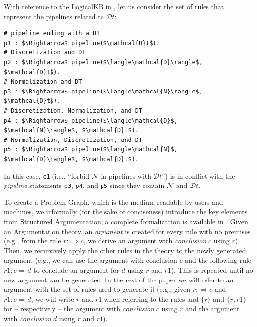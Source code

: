 \begin{example}
With reference to the LogicalKB in , let us consider the set of rules that represent the pipelines related to $\mathcal{D}t$:
\begin{lstlisting}[mathescape=true]
# pipeline ending with a DT
p1 : $\Rightarrow$ pipeline($\mathcal{D}t$).
# Discretization and DT
p2 : $\Rightarrow$ pipeline($\langle\mathcal{D}\rangle$, $\mathcal{D}t$).
# Normalization and DT
p3 : $\Rightarrow$ pipeline($\langle\mathcal{N}\rangle$, $\mathcal{D}t$).
# Discretization, Normalization, and DT
p4 : $\Rightarrow$ pipeline($\langle\mathcal{D}$, $\mathcal{N}\rangle$, $\mathcal{D}t$).
# Normalization, Discretization, and DT
p5 : $\Rightarrow$ pipeline($\langle\mathcal{N}$, $\mathcal{D}\rangle$, $\mathcal{D}t$).
\end{lstlisting}
In this case, \texttt{c1} (i.e., ``forbid $\mathcal{N}$ in pipelines with $\mathcal{D}t$'') is in conflict with the \emph{pipeline} statements \texttt{p3}, \texttt{p4}, and \texttt{p5} since they contain $\mathcal{N}$ and $\mathcal{D}t$.
\label{ex:conflict}
\end{example}

To create a Problem Graph, which is the medium readable by users and machines, we informally (for the sake of conciseness) introduce the key elements from Structured Argumentation; a complete formalization is available in \cite{Modgil2014aspic+}.
Given an Argumentation theory, an \emph{argument} is created for every rule with no premises (e.g., from the rule $r : \Rightarrow c$, we derive an argument with \emph{conclusion} $c$ using $r$).
Then, we recursively apply the other rules in the theory to the newly generated argument (e.g., we can use the argument with conclusion $c$ and the following rule $r1 : c \Rightarrow d$ to conclude an argument for $d$ using $r$ and $r1$).
This is repeated until no new argument can be generated.
In the rest of the paper we will refer to an argument with the set of rules used to generate it (e.g., given $r : \Rightarrow c$ and $r1 : c \Rightarrow d$, we will write $r$ and $r1$ when referring to the rules and $\{r\}$ and $\{r, r1\}$ for -- respectively -- the argument with \emph{conclusion} $c$ using $r$ and the argument with \emph{conclusion} $d$ using $r$ and $r1$).

